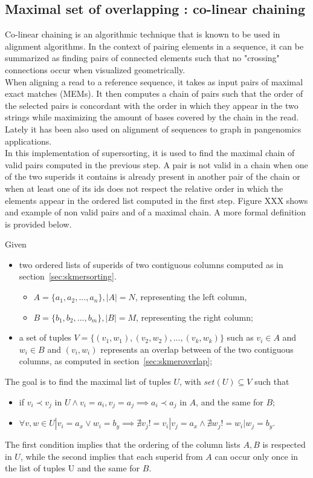 \subsection{Maximal set of overlapping \kmers: co-linear chaining}
Co-linear chaining is an algorithmic technique that is known to be used in alignment algorithms. In the context of pairing elements in a sequence, it can be summarized as finding pairs of connected elements such that no "crossing" connections occur when visualized geometrically. \\
When aligning a read to a reference sequence, it takes as input pairs of maximal exact matches (MEMs). It then computes a chain of pairs such that the order of the selected pairs is concordant with the order in which they appear in the two strings while maximizing the amount of bases covered by the chain in the read. Lately it has been also used on alignment of sequences to graph in pangenomics applications.\\
In this implementation of super\kmer sorting, it is used to find the maximal chain of valid pairs computed in the previous step. A pair is not valid in a chain when one of the two super\kmer ids it contains is already present in another pair of the chain or when at least one of its ids does not respect the relative order in which the elements appear in the ordered list computed in the first step. Figure XXX shows and example of non valid pairs and of a maximal chain. A more formal definition is provided below.\\
\begin{definition}
	Given 
	\begin{itemize}
		\item two ordered lists of super\kmer ids of two contiguous columns computed as in section~\ref{sec:skmersorting}.
		\begin{itemize}
			\item $ A = \{a_1, a_2, ..., a_n\}, |A| = N $, representing the left column,
			\item $ B = \{b_1, b_2, ..., b_m\}, |B| = M $, representing the right column;
		\end{itemize}
		\item a set of tuples $ V = \{(v_1,w_1),(v_2,w_2), ..., (v_k,w_k) \}$ such as $ v_i \in A$ and $ w_i \in B$ and $(v_i,w_i)$ represents an overlap between \kmers of the two contiguous columns, as computed in section~\ref{sec:skmeroverlap};
	\end{itemize}
	The goal is to find the maximal list of tuples $ U$, with $set(U) \subseteq V$ such that 
	\begin{itemize}
		\item if $v_i \prec v_j$ in $U \land v_i=a_i, v_j=a_j \implies a_i \prec a_j$ in $A$, and the same for $B$;
		\item $\forall v, w \in U | v_i = a_x \lor w_i = b_y \implies \nexists v_j != v_i | v_j = a_x \land \nexists w_j != w_i | w_j = b_y$.  
	\end{itemize}
	The first condition implies that the ordering of the column lists $A, B$ is respected in $U$, while the second implies that each super\kmer id from $A$ can occur only once in the list of tuples U and the same for $B$.
\end{definition}
